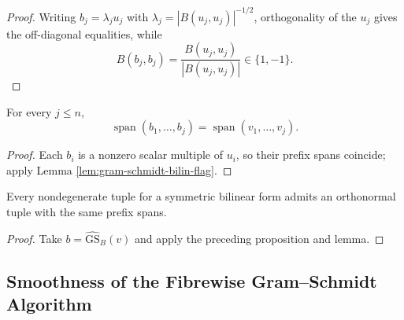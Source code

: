 \begin{proof}

\sketch Writing $b_j=\lambda_ju_j$ with
$\lambda_j=|B(u_j,u_j)|^{-1/2}$, orthogonality of the $u_j$ gives the off-diagonal
equalities, while
\[
B(b_j,b_j)=\frac{B(u_j,u_j)}{|B(u_j,u_j)|}\in\{1,-1\}.
\]
\end{proof}

\begin{lemma}
\label{lem:gram-schmidt-bilin-normed-flag}





For every $j\leq n$,
\[
\operatorname{span}(b_1,\ldots,b_j)=\operatorname{span}(v_1,\ldots,v_j).
\]
\end{lemma}

\begin{proof}

\sketch Each $b_i$ is a nonzero scalar multiple of $u_i$, so their prefix spans
coincide; apply Lemma \ref{lem:gram-schmidt-bilin-flag}.
\end{proof}

\begin{corollary}
\label{cor:gram-schmidt-bilin-recovers}





Every nondegenerate tuple for a symmetric bilinear form admits an orthonormal tuple
with the same prefix spans.
\end{corollary}

\begin{proof}

\sketch Take $b=\widehat{\mathrm{GS}}_B(v)$ and apply the preceding proposition and
lemma.
\end{proof}

\subsection{Smoothness of the Fibrewise Gram--Schmidt Algorithm}

